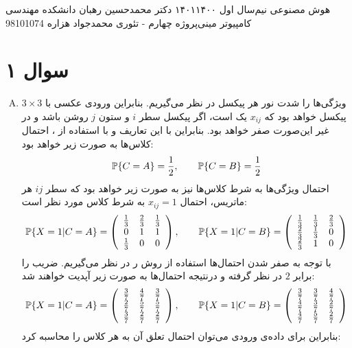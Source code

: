 \documentclass[a4paper, 12pt]{article}
\begin{document}
\handout
{هوش مصنوعی}
{نیم‌سال اول
۱۴۰۱\lr{-}۱۴۰۰}
{دکتر محمدحسین رهبان}
{دانشکده مهندسی کامپیوتر}
{مینی‌پروژه چهارم - تئوری}
{محمدجواد هزاره}
{98101074}
\noindent
\\[-6em]
\section*{سوال ۱}
\begin{enumerate}[A)]
	\item
	ویژگی‌ها را شدت نور هر پیکسل در نظر می‌گیریم. بنابراین ورودی عکسی با $3\times 3$ پیکسل خواهد بود که 
	$x_{ij}$
	یک است، اگر پیکسل سطر $i$ و ستون $j$ روشن باشد و در غیر این‌صورت صفر خواهد بود. بنابراین با این تعاریف و با استفاده از ، احتمال کلاس‌ها به صورت زیر خواهد بود:
	\[
	{\mathbb P}\{C=A\} = \frac{1}{2},\qquad {\mathbb P}\{C=B\} = \frac{1}{2}
	\]
	احتمال ویژگی‌ها به شرط کلاس‌ها نیز به صورت زیر خواهد بود که سطر $ij$ هر ماتریس، احتمال $x_{ij} = 1$ به شرط کلاس مورد نظر است:
	\[
	{\mathbb P}\{X=1|C=A\} = \left(\begin{array}{ccc}
		\frac{1}{3} & \frac{2}{3} & \frac{1}{3} \\
		0 & 1 & 1 \\
		\frac{1}{3} & 0 & 0
	\end{array}\right), \qquad
	{\mathbb P}\{X=1|C=B\} = \left(\begin{array}{ccc}
		\frac{1}{3} & \frac{1}{3} & \frac{2}{3} \\
		\frac{2}{3} & \frac{1}{3} & 0\\
		\frac{2}{3} & 1 & 0
	\end{array}\right)
	\]
	با توجه به صفر شدن احتمال‌ها استفاده از روش  ر در نظر می‌گیریم. ضریب  را برابر $2$ در نظر گرفته و درنتیجه احتمال‌ها به صورت زیر آپدیت خواهند شد:
	\[
	{\mathbb P}\{X=1|C=A\} = \left(\begin{array}{ccc}
		\frac{3}{7} & \frac{4}{7} & \frac{3}{7} \\
		\frac{2}{7} & \frac{5}{7} & \frac{5}{7} \\
		\frac{3}{7} & \frac{2}{7} & \frac{2}{7}
	\end{array}\right), \qquad
	{\mathbb P}\{X=1|C=B\} = \left(\begin{array}{ccc}
		\frac{3}{7} & \frac{3}{7} & \frac{4}{7} \\
		\frac{4}{7} & \frac{3}{7} & \frac{2}{7}\\
		\frac{4}{7} & \frac{5}{7} & \frac{2}{7}
	\end{array}\right)
	\]
	بنابراین برای داده‌ی ورودی می‌توان احتمال تعلق آن به هر کلاس را محاسبه کرد:

\end{enumerate}
\end{document}
